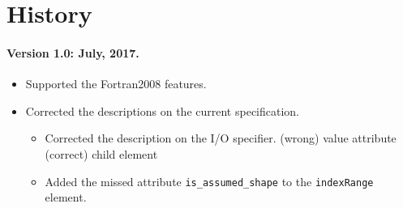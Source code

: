 \section*{History}

\paragraph*{Version 1.0: July, 2017.}
\begin{itemize}
  \item Supported the Fortran2008 features.
  \item Corrected the descriptions on the current specification.
  \begin{itemize}
    \item Corrected the description on the I/O specifier.\newline
          (wrong) value attribute \newline (correct) child element
    \item Added the missed attribute {\tt is\_assumed\_shape} to the {\tt indexRange} element.
  \end{itemize}
\end{itemize}

%
%
%
%
%

